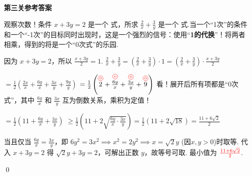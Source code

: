\begin{solution}
	\textbf{第三关参考答案}
	
	\textcolor{green!50!black}{观察次数！条件 $x+3y=2$ 是一个  式，所求 $\frac{2}{x}+\frac{3}{y}$ 是一个  式.当一个“1次”的条件和一个“-1次”的目标同时出现时，这是一个强烈的信号：使用“\textbf{1的代换}”！将两者相乘，得到的将是一个“0次式”的乐园.}
	
		因为 $x+3y=2$，所以 $\frac{x+3y}{2}=1$.
		$\frac{2}{x}+\frac{3}{y} = \left(\frac{2}{x}+\frac{3}{y}\right) \cdot 1 = \left(\frac{2}{x}+\frac{3}{y}\right) \cdot \frac{x+3y}{2}$
		
		$= \frac{1}{2} \left( \frac{2x}{x} + \frac{6y}{x} + \frac{3x}{y} + \frac{9y}{y} \right)$
		$= \frac{1}{2} \left( \degree{0}{2} + \degree{0}{\frac{6y}{x}} + \degree{0}{\frac{3x}{y}} + \degree{0}{9} \right)$
		\textcolor{green!50!black}{看！展开后所有项都是“0次式”，其中 $\frac{6y}{x}$ 和 $\frac{3x}{y}$ 互为倒数关系，乘积为定值！}

		$= \frac{1}{2} \left( 11 + \frac{6y}{x} + \frac{3x}{y} \right)$
		$\ge \frac{1}{2} \left( 11 + 2\sqrt{\frac{6y}{x} \cdot \frac{3x}{y}} \right) = \frac{1}{2}(11+2\sqrt{18}) = \frac{11+6\sqrt{2}}{2}$
		
		当且仅当 $\frac{6y}{x}=\frac{3x}{y}$，即 $6y^2=3x^2 \implies x^2=2y^2 \implies x=\sqrt{2}y$ (因$x,y>0$)时取等.
		代入 $x+3y=2$ 得 $\sqrt{2}y+3y=2$，可解出正数 $y$，故等号可取.
	最小值为 $\textcolor{red}{\frac{11+6\sqrt{2}}{2}}$.
\end{solution}
\qed
